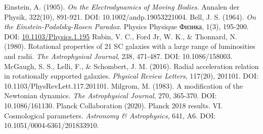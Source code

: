 \documentclass[12pt,a4paper]{article}
\begin{document}
\begin{thebibliography}{99}
		 Einstein, A. (1905). \textit{On the Electrodynamics of Moving Bodies}. Annalen der Physik, 322(10), 891-921. DOI: 10.1002/andp.19053221004.
		 Bell, J. S. (1964). \textit{On the Einstein-Podolsky-Rosen Paradox}. Physics Physique {\selectfont Физика}, 1(3), 195-200. DOI: \href{https://doi.org/10.1103/Physics.1.195}{10.1103/Physics.1.195}
		 Rubin, V. C., Ford Jr, W. K., \& Thonnard, N. (1980). Rotational properties of 21 SC galaxies with a large range of luminosities and radii. \textit{The Astrophysical Journal}, 238, 471-487. DOI: 10.1086/158003.
		 McGaugh, S. S., Lelli, F., \& Schombert, J. M. (2016). Radial acceleration relation in rotationally supported galaxies. \textit{Physical Review Letters}, 117(20), 201101. DOI: 10.1103/PhysRevLett.117.201101.
		 Milgrom, M. (1983). A modification of the Newtonian dynamics. \textit{The Astrophysical Journal}, 270, 365-370. DOI: 10.1086/161130.
		 Planck Collaboration (2020). Planck 2018 results. VI. Cosmological parameters. \textit{Astronomy \& Astrophysics}, 641, A6. DOI: 10.1051/0004-6361/201833910.
	\end{thebibliography}
	
\end{document}
